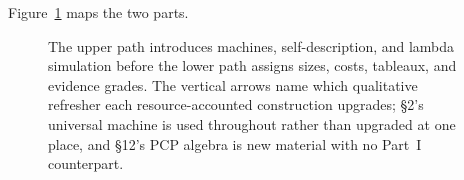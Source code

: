 \documentclass[11pt]{article}
\theoremstyle{definition}
\begin{document}
Figure~\ref{fig:roadmap} maps the two parts.

\vfill
\begin{figure}[h]
\centering

\caption{The upper path introduces machines, self-description, and lambda simulation before the lower path assigns sizes, costs, tableaux, and evidence grades.  The vertical arrows name which qualitative refresher each resource-accounted construction upgrades; \S2's universal machine is used throughout rather than upgraded at one place, and \S12's PCP algebra is new material with no Part~I counterpart.}
\label{fig:roadmap}
\end{figure}




\end{document}

